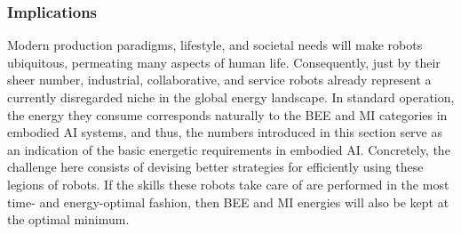 \subsubsection{Implications}
Modern production paradigms, lifestyle, and societal needs will make robots ubiquitous, permeating many aspects of human life. Consequently, just by their sheer number, industrial, collaborative, and service robots already represent a currently disregarded niche in the global energy landscape. In standard operation, the energy they consume corresponds naturally to the BEE and MI categories in embodied AI systems, and thus, the numbers introduced in this section serve as an indication of the basic energetic requirements in embodied AI. Concretely, the challenge here consists of devising better strategies for efficiently using these legions of robots. If the skills these robots take care of are performed in the most time- and energy-optimal fashion, then BEE and MI energies will also be kept at the optimal minimum.
